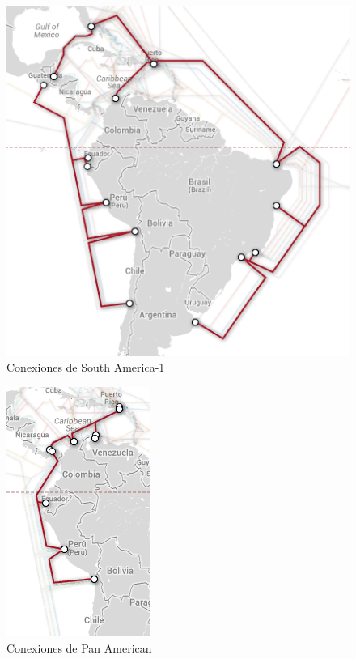 \documentclass{article}
\begin{document}
\begin{figure}[H]
    \centering
    \includegraphics[scale=0.5]{SAm-1}
    \caption{Conexiones de South America-1}
\end{figure}

\begin{figure}[H]
    \centering
    \includegraphics[scale=0.54]{PanAm}
    \caption{Conexiones de Pan American}
\end{figure}
\end{document}

